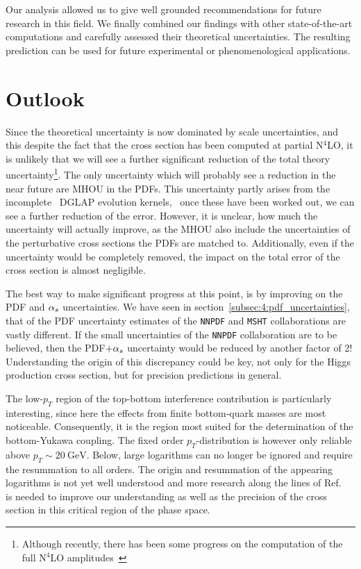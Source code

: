 Our analysis allowed us to give well grounded recommendations for future research in this field. We finally combined our findings with other state-of-the-art computations and carefully assessed their theoretical uncertainties. The resulting prediction can be used for future experimental or phenomenological applications.

\section{Outlook}
Since the theoretical uncertainty is now dominated by scale uncertainties, and this despite the fact that the cross section has been computed at partial N${}^4$LO, it is unlikely that we will see a further significant reduction of the total theory uncertainty\footnote{Although recently, there has been some progress on the computation of the full N${}^4$LO amplitudes~\cite{Chen:2025utl}}. The only uncertainty which will probably see a reduction in the near future are \acs{MHOU} in the \acs{PDF}s. This uncertainty partly arises from the incomplete \NNNLO\ DGLAP evolution kernels, \ie\ once these have been worked out, we can see a further reduction of the error. However, it is unclear, how much the uncertainty will actually improve, as the \acs{MHOU} also include the uncertainties of the perturbative cross sections the \acs{PDF}s are matched to. Additionally, even if the uncertainty would be completely removed, the impact on the total error of the cross section is almost negligible.

The best way to make significant progress at this point, is by improving on the \acs{PDF} and $\alpha_s$ uncertainties. We have seen in section~\ref{subsec:4:pdf_uncertainties}, that of the \acs{PDF} uncertainty estimates of the \texttt{NNPDF} and \texttt{MSHT} collaborations are vastly different. If the small uncertainties of the \texttt{NNPDF} collaboration are to be believed, then the \acs{PDF}$ + \alpha_s$ uncertainty would be reduced by another factor of 2! Understanding the origin of this discrepancy could be key, not only for the Higgs production cross section, but for precision predictions in general.

The low-$p_T$ region of the top-bottom interference contribution is particularly interesting, since here the effects from finite bottom-quark masses are most noticeable. Consequently, it is the region most suited for the determination of the bottom-Yukawa coupling. The fixed order $p_T$-distribution is however only reliable above $p_T \sim 20 \ \mathrm{GeV}$. Below, large logarithms can no longer be ignored and require the resummation to all orders. The origin and resummation of the appearing logarithms is not yet well understood and more research along the lines of Ref.~\cite{Caola:2018zye, Liu:2017vkm} is needed to improve our understanding as well as the precision of the cross section in this critical region of the phase space.

